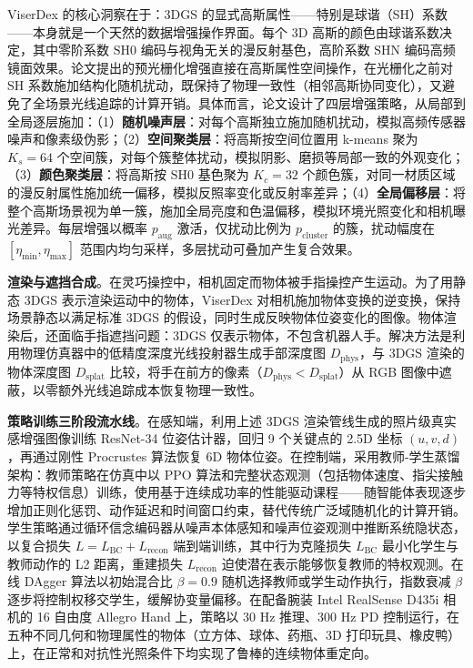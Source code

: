 ViserDex 的核心洞察在于：3DGS 的显式高斯属性——特别是球谐（SH）系数——本身就是一个天然的数据增强操作界面。每个 3D 高斯的颜色由球谐系数决定，其中零阶系数 $\text{SH0}$ 编码与视角无关的漫反射基色，高阶系数 $\text{SHN}$ 编码高频镜面效果。论文提出的预光栅化增强直接在高斯属性空间操作，在光栅化之前对 SH 系数施加结构化随机扰动，既保持了物理一致性（相邻高斯协同变化），又避免了全场景光线追踪的计算开销。具体而言，论文设计了四层增强策略，从局部到全局逐层施加：（1）\textbf{随机噪声层}：对每个高斯独立施加随机扰动，模拟高频传感器噪声和像素级伪影；（2）\textbf{空间聚类层}：将高斯按空间位置用 k-means 聚为 $K_s=64$ 个空间簇，对每个簇整体扰动，模拟阴影、磨损等局部一致的外观变化；（3）\textbf{颜色聚类层}：将高斯按 $\text{SH0}$ 基色聚为 $K_c=32$ 个颜色簇，对同一材质区域的漫反射属性施加统一偏移，模拟反照率变化或反射率差异；（4）\textbf{全局偏移层}：将整个高斯场景视为单一簇，施加全局亮度和色温偏移，模拟环境光照变化和相机曝光差异。每层增强以概率 $p_\text{aug}$ 激活，仅扰动比例为 $p_\text{cluster}$ 的簇，扰动幅度在 $[\eta_\text{min}, \eta_\text{max}]$ 范围内均匀采样，多层扰动可叠加产生复合效果。

\textbf{渲染与遮挡合成}。在灵巧操控中，相机固定而物体被手指操控产生运动。为了用静态 3DGS 表示渲染运动中的物体，ViserDex 对相机施加物体变换的逆变换，保持场景静态以满足标准 3DGS 的假设，同时生成反映物体位姿变化的图像。物体渲染后，还面临手指遮挡问题：3DGS 仅表示物体，不包含机器人手。解决方法是利用物理仿真器中的低精度深度光线投射器生成手部深度图 $D_\text{phys}$，与 3DGS 渲染的物体深度图 $D_\text{splat}$ 比较，将手在前方的像素（$D_\text{phys} < D_\text{splat}$）从 RGB 图像中遮蔽，以零额外光线追踪成本恢复物理一致性。

\textbf{策略训练三阶段流水线}。在感知端，利用上述 3DGS 渲染管线生成的照片级真实感增强图像训练 ResNet-34 位姿估计器，回归 9 个关键点的 2.5D 坐标 $(u, v, d)$，再通过刚性 Procrustes 算法恢复 6D 物体位姿。在控制端，采用教师-学生蒸馏架构：教师策略在仿真中以 PPO 算法和完整状态观测（包括物体速度、指尖接触力等特权信息）训练，使用基于连续成功率的性能驱动课程——随智能体表现逐步增加正则化惩罚、动作延迟和时间窗口约束，替代传统广泛域随机化的计算开销。学生策略通过循环信念编码器从噪声本体感知和噪声位姿观测中推断系统隐状态，以复合损失 $L = L_\text{BC} + L_\text{recon}$ 端到端训练，其中行为克隆损失 $L_\text{BC}$ 最小化学生与教师动作的 L2 距离，重建损失 $L_\text{recon}$ 迫使潜在表示能够恢复教师的特权观测。在线 DAgger 算法以初始混合比 $\beta=0.9$ 随机选择教师或学生动作执行，指数衰减 $\beta$ 逐步将控制权移交学生，缓解协变量偏移。在配备腕装 Intel RealSense D435i 相机的 16 自由度 Allegro Hand 上，策略以 30 Hz 推理、300 Hz PD 控制运行，在五种不同几何和物理属性的物体（立方体、球体、药瓶、3D 打印玩具、橡皮鸭）上，在正常和对抗性光照条件下均实现了鲁棒的连续物体重定向。

